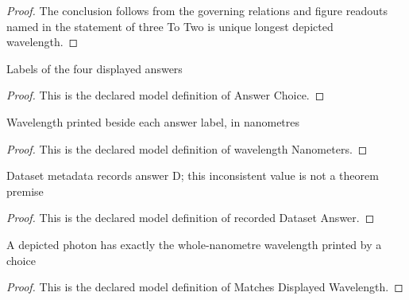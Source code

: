 \begin{proof}
  The conclusion follows from the governing relations and figure readouts named in the statement of three To Two is unique longest depicted wavelength.
\end{proof}
\begin{definition}
  \label{def:physics:phyx-mini-0536:phyxminiproblems-problemphyxmini0536-answerchoice}
  Labels of the four displayed answers
\end{definition}
\begin{proof}
  This is the declared model definition of Answer Choice.
\end{proof}
\begin{definition}
  \label{def:physics:phyx-mini-0536:phyxminiproblems-problemphyxmini0536-answerchoice-wavelengthnanometers}
  Wavelength printed beside each answer label, in nanometres
\end{definition}
\begin{proof}
  This is the declared model definition of wavelength Nanometers.
\end{proof}
\begin{definition}
  \label{def:physics:phyx-mini-0536:phyxminiproblems-problemphyxmini0536-recordeddatasetanswer}
  Dataset metadata records answer D; this inconsistent value is not a theorem premise
\end{definition}
\begin{proof}
  This is the declared model definition of recorded Dataset Answer.
\end{proof}
\begin{definition}
  \label{def:physics:phyx-mini-0536:phyxminiproblems-problemphyxmini0536-matchesdisplayedwavelength}
  A depicted photon has exactly the whole-nanometre wavelength printed by a choice
\end{definition}
\begin{proof}
  This is the declared model definition of Matches Displayed Wavelength.
\end{proof}
